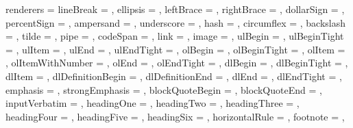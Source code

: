 renderers = {%
  lineBreak = {%
    },
  ellipsis = {%
    },
  leftBrace = {%
    },
  rightBrace = {%
    },
  dollarSign = {%
    },
  percentSign = {%
    },
  ampersand = {%
    },
  underscore = {%
    },
  hash = {%
    },
  circumflex = {%
    },
  backslash = {%
    },
  tilde = {%
    },
  pipe = {%
    },
  codeSpan = {%
    },
  link = {%
    \TYPE{====================}
    \TYPE{====================}},
  image = {%
    \TYPE{====================}
    \TYPE{====================}},
  ulBegin = {%
    },
  ulBeginTight = {%
    },
  ulItem = {%
    },
  ulEnd = {%
    },
  ulEndTight = {%
    },
  olBegin = {%
    },
  olBeginTight = {%
    },
  olItem = {%
    },
  olItemWithNumber = {%
    },
  olEnd = {%
    },
  olEndTight = {%
    },
  dlBegin = {%
    },
  dlBeginTight = {%
    },
  dlItem = {%
    },
  dlDefinitionBegin = {%
    },
  dlDefinitionEnd = {%
    },
  dlEnd = {%
    },
  dlEndTight = {%
    },
  emphasis = {%
    },
  strongEmphasis = {%
    },
  blockQuoteBegin = {%
    },
  blockQuoteEnd = {%
    },
  inputVerbatim = {%
    },
  headingOne = {%
    },
  headingTwo = {%
    },
  headingThree = {%
    },
  headingFour = {%
    },
  headingFive = {%
    },
  headingSix = {%
    },
  horizontalRule = {%
    },
  footnote = {%
    },
}
